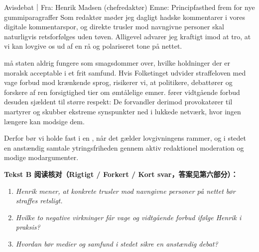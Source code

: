 \begin{emailbox}{Avisdebat｜Fra: Henrik Madsen (chefredaktør) \quad Emne: Principfasthed frem for nye gummiparagraffer}
Som redaktør møder jeg dagligt hadske kommentarer i vores digitale kommentarspor, og direkte trusler mod navngivne personer skal naturligvis retsforfølges uden tøven. Alligevel advarer jeg kraftigt imod at tro, at vi kan lovgive os ud af en rå og polariseret tone på nettet.

 må staten aldrig fungere som smagsdommer over, hvilke holdninger der er moralsk acceptable i et frit samfund. Hvis Folketinget udvider straffeloven med vage forbud mod krænkende sprog, risikerer vi, at politikere, debattører og forskere af ren forsigtighed tier om ømtålelige emner.  fører vidtgående forbud desuden sjældent til større respekt: De forvandler derimod provokatører til martyrer og skubber ekstreme synspunkter ned i lukkede netværk, hvor ingen længere kan modsige dem.

Derfor bør vi holde fast i en , når det gælder lovgivningens rammer, og i stedet  en anstændig samtale  ytringsfriheden gennem aktiv redaktionel moderation og modige modargumenter.
\end{emailbox}

\textbf{Tekst B 阅读核对（Rigtigt / Forkert / Kort svar，答案见第六部分）：}
\begin{enumerate}
  \item \textit{Henrik mener, at konkrete trusler mod navngivne personer på nettet bør straffes retsligt.} \underline{\hspace{2.2cm}}
  \item \textit{Hvilke to negative virkninger får vage og vidtgående forbud ifølge Henrik i praksis?} \underline{\hspace{2.2cm}}
  \item \textit{Hvordan bør medier og samfund i stedet sikre en anstændig debat?} \underline{\hspace{2.2cm}}
\end{enumerate}

